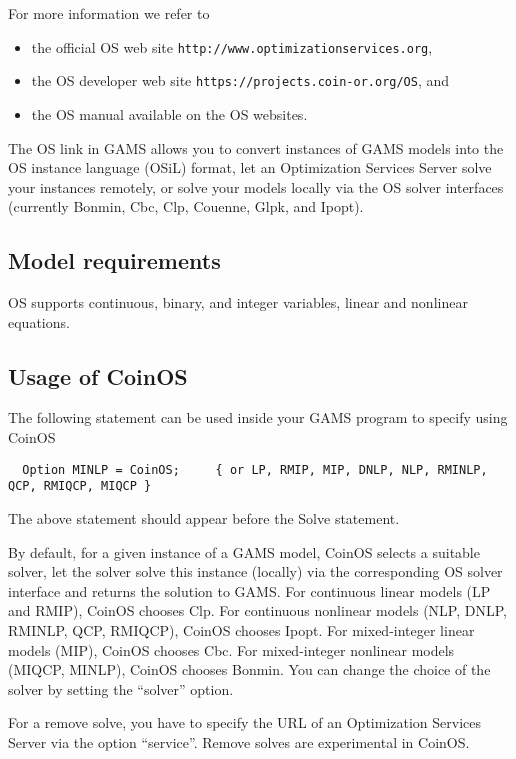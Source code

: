 For more information we refer to
\begin{itemize}
\item the official OS web site \texttt{http://www.optimizationservices.org},
\item the OS developer web site \texttt{https://projects.coin-or.org/OS}, and
\item the OS manual available on the OS websites.
\end{itemize}

The OS link in GAMS allows you to convert instances of GAMS models into the OS instance language (OSiL) format, let an Optimization Services Server solve your instances remotely, or solve your models locally via the OS solver interfaces (currently Bonmin, Cbc, Clp, Couenne, Glpk, and Ipopt).

\subsection{Model requirements}

OS supports continuous, binary, and integer variables, linear and nonlinear equations.

\subsection{Usage of CoinOS}

The following statement can be used inside your GAMS program to specify using CoinOS
\begin{verbatim}
  Option MINLP = CoinOS;     { or LP, RMIP, MIP, DNLP, NLP, RMINLP, QCP, RMIQCP, MIQCP }
\end{verbatim}

The above statement should appear before the Solve statement.

By default, for a given instance of a GAMS model, CoinOS selects a suitable solver, let the solver solve this instance (locally) via the corresponding OS solver interface and returns the solution to GAMS.
For continuous linear models (LP and RMIP), CoinOS chooses Clp.
For continuous nonlinear models (NLP, DNLP, RMINLP, QCP, RMIQCP), CoinOS chooses Ipopt.
For mixed-integer linear models (MIP), CoinOS chooses Cbc.
For mixed-integer nonlinear models (MIQCP, MINLP), CoinOS chooses Bonmin.
You can change the choice of the solver by setting the ``solver'' option.

For a remove solve, you have to specify the URL of an Optimization Services Server via the option ``service''.
Remove solves are experimental in CoinOS.

